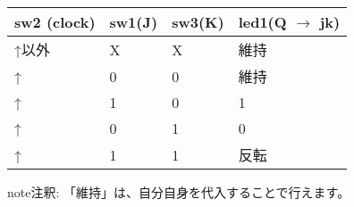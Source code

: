\documentclass[letterpaper,10pt,dvipdfmx]{sphinxmanual}
\begin{document}
\begin{figure}[htbp]
\centering

\noindent{}
\end{figure}


\begin{savenotes}\sphinxattablestart
\centering
{}
\sphinxthecaptionisattop
{}\label{\detokenize{05_try:id37}}
\sphinxaftertopcaption
\begin{tabulary}{\linewidth}[t]{|T|T|T|T|}
\hline
\sphinxstyletheadfamily 
sw2 (clock)
&\sphinxstyletheadfamily 
sw1(J)
&\sphinxstyletheadfamily 
sw3(K)
&\sphinxstyletheadfamily 
led1(Q \(\rightarrow\) jk)
\\
\hline
↑以外
&
X
&
X
&
維持
\\
\hline
↑
&
0
&
0
&
維持
\\
\hline
↑
&
1
&
0
&
1
\\
\hline
↑
&
0
&
1
&
0
\\
\hline
↑
&
1
&
1
&
反転
\\
\hline
\end{tabulary}
\par
\sphinxattableend\end{savenotes}

\begin{sphinxadmonition}{note}{注釈:}
「維持」は、自分自身を代入することで行えます。
\end{sphinxadmonition}
\end{document}
